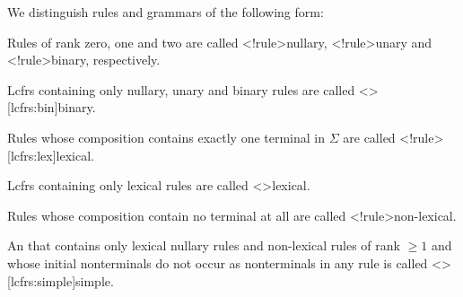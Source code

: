 \documentclass[../../document.tex]{subfiles}
\begin{document}
    \begin{definition}
        We distinguish rules and grammars of the following form:
        \begin{compactitem}
            \item Rules of rank zero, one and two are called <\lcfrs!rule>{nullary}, <\lcfrs!rule>{unary} and <\lcfrs!rule>{binary}, respectively.
            \item Lcfrs containing only nullary, unary and binary rules are called <\lcfrs>[lcfrs:bin]{binary}.
            \item Rules whose composition contains exactly one terminal in \(\varSigma\) are called <\lcfrs!rule>[lcfrs:lex]{lexical}.
            \item Lcfrs containing only lexical rules are called <\lcfrs>{lexical}.
            \item Rules whose composition contain no terminal at all are called <\lcfrs!rule>{non-lexical}.
            \item
                An  that contains only lexical nullary rules and non-lexical rules of rank \(\ge 1\) and whose initial nonterminals do not occur as  nonterminals in any rule is called <\lcfrs>[lcfrs:simple]{simple}.
        \end{compactitem}
    \end{definition}
\end{document}
